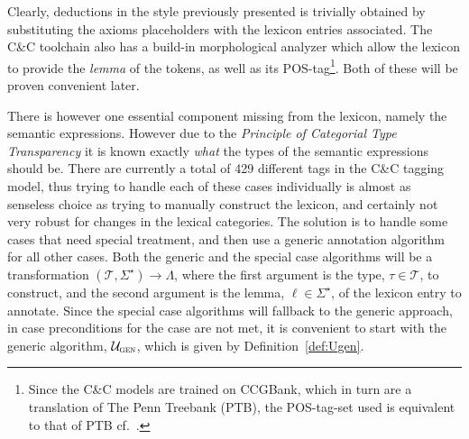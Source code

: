 Clearly, deductions in the style previously presented is trivially obtained by substituting the axioms placeholders with the lexicon entries associated. The C\&C toolchain also has a build-in morphological analyzer which allow the lexicon to provide the \emph{lemma} of the tokens, as well as its POS-tag\footnote{Since the C\&C models are trained on CCGBank, which in turn are a translation of The Penn Treebank (PTB), the POS-tag-set used is equivalent to that of PTB cf.\ \cite{pennTreebank}.}. Both of these will be proven convenient later.

There is however one essential component missing from the lexicon, namely the semantic expressions. However due to the \emph{Principle of Categorial Type Transparency} it is known exactly \emph{what} the types of the semantic expressions should be. There are currently a total of 429 different tags in the C\&C tagging model, thus trying to handle each of these cases individually is almost as senseless choice as trying to manually construct the lexicon, and certainly not very robust for changes in the lexical categories. The solution is to handle some cases that need special treatment, and then use a generic annotation algorithm for all other cases. Both the generic and the special case algorithms will be a transformation $(\mathcal{T}, \Sigma^\star) \to \Lambda$, where the first argument is the type, $\tau \in \mathcal{T}$, to construct, and the second argument is the lemma, $\ell \in \Sigma^\star$, of the lexicon entry to annotate. Since the special case algorithms will fallback to the generic approach, in case preconditions for the case are not met, it is convenient to start with the generic algorithm, $\mathcal{U}_\textsc{gen}$, which is given by Definition~\ref{def:Ugen}.

